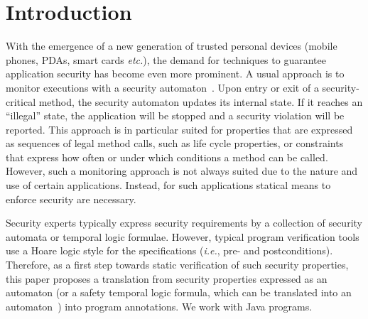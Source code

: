 \section{Introduction}\label{SecIntro}

With the emergence of a new generation of trusted personal devices
(mobile phones, PDAs, smart cards \emph{etc.}), the demand for
techniques to guarantee application security has become even more
prominent. A usual approach is to monitor
executions with a security automaton~\cite{Schneider99}. Upon entry
or exit of a security-critical method, the security automaton updates
its internal state. If it reaches an ``illegal'' state, the
application will be stopped and a security violation will be
reported. This approach is in particular suited for properties that
are expressed as sequences of legal method calls, such as life cycle
properties, or constraints that express how often or under which
conditions a method can be called.
%
However, such a monitoring approach is not always suited due to the
nature and use of certain applications.
Instead, for such applications statical means to enforce security are necessary.

Security experts typically express security requirements by a collection of
security automata or temporal logic formulae. However, typical program
verification tools use a Hoare logic style for the specifications
(\emph{i.e.}, pre- and postconditions).
Therefore, as a first step towards static
verification of such security properties, this paper proposes a
translation from security properties expressed as an automaton (or a
safety temporal logic formula, which can be translated into an
automaton~\cite{Wolper01}) into program annotations.
We work with Java programs.

